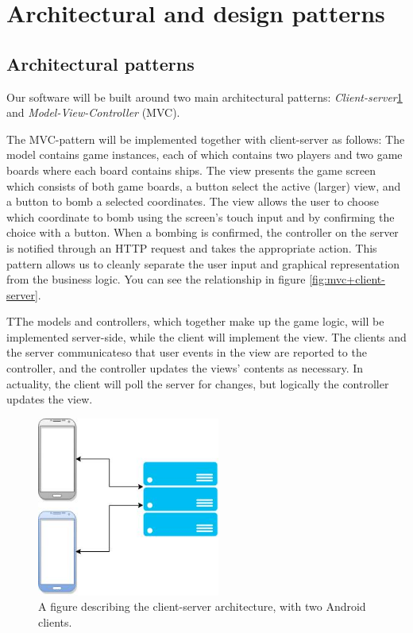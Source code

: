 \section{Architectural and design patterns}

\subsection{Architectural patterns}
Our software will be built around two main architectural patterns: \textit{Client-server}\ref{fig:androidclient-server} and \textit{Model-View-Controller} (MVC).

The MVC-pattern will be implemented together with client-server as follows: The model contains game instances, each of which contains two players and two game boards where each board contains ships. The view presents the game screen which consists of both game boards, a button select the active (larger) view, and a button to bomb a selected coordinates. The view allows the user to choose which coordinate to bomb using the screen's touch input and by confirming the choice with a button. When a bombing is confirmed, the controller on the server is notified through an HTTP request and takes the appropriate action. This pattern allows us to cleanly separate the user input and graphical representation from the business logic. You can see the relationship in figure \ref{fig:mvc+client-server}.

TThe models and controllers, which together make up the game logic, will be implemented server-side, while the client will implement the view. The clients and the server communicateso that user events in the view are reported to the controller, and the controller updates the
views’ contents as necessary. In actuality, the client will poll the server for changes, but logically the controller updates the view. 
\begin{figure}[h]
  \centering
    \includegraphics[width=60mm]{figs/androidclient-server.jpg}
  \caption{A figure describing the client-server architecture, with two Android clients.}
\label{fig:androidclient-server}
\end{figure}

